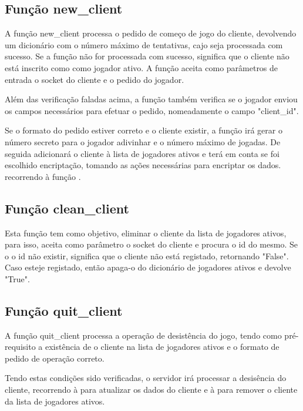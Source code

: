 \documentclass{report}
\begin{document}
\subsection{Função new\_client}
\label{ssec:func_new_client}

A função new\_client processa o pedido de começo de jogo do cliente, devolvendo um dicionário com o número máximo de tentativas, cajo seja processada com sucesso. Se a função não for processada com sucesso, significa que o cliente não está inscrito como como jogador ativo. A função aceita como parâmetros de entrada o socket do cliente e o pedido do jogador.

Além das verificação faladas acima, a função também verifica se o jogador enviou os campos necessários para efetuar o pedido, nomeadamente o campo "client\_id".

Se o formato do pedido estiver correto e o cliente existir, a função irá gerar o número secreto para o jogador adivinhar e o número máximo de jogadas. De seguida adicionará o cliente à lista de jogadores ativos e terá em conta se foi escolhido encriptação, tomando as ações necessárias para encriptar os dados. recorrendo à função  .

\subsection{Função clean\_client}
\label{ssec:func_clean_client}

Esta função tem como objetivo, eliminar o cliente da lista de jogadores ativos, para isso, aceita como parâmetro o socket do cliente e procura o id do mesmo. Se o o id não existir, significa que o cliente não está registado, retornando "False". Caso esteje registado, então apaga-o do dicionário de jogadores ativos e devolve "True".

\subsection{Função quit\_client}
\label{ssec:func_quit_client}

A função quit\_client processa a operação de desistência do jogo, tendo como pré-requisito a existência de o cliente na lista de jogadores ativos e o formato de pedido de operação correto.

Tendo estas condições sido verificadas, o servidor irá processar a desisência do cliente, recorrendo à  para atualizar os dados do cliente e à  para remover o cliente da lista de jogadores ativos.
\end{document}
